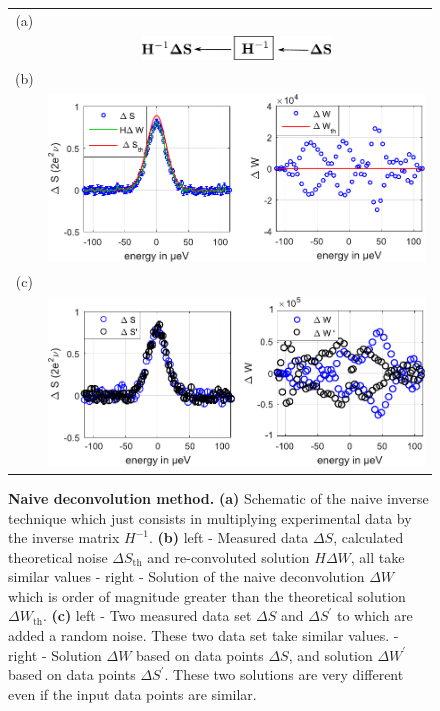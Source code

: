 \begin{figure}[hptb]
	\begin{center}
\begin{tabular}{c c}
	(a) &  \\ 
	
	& \includegraphics[width = 5cm]{./appA/naive_deconvolution} \\ 
	 
	(b) &  \\ 
	
	& \includegraphics[width = 10 cm]{./appA/Naive_method_results} \\
	(c) &  \\ 
	
	& \includegraphics[width = 10 cm]{./appA/Naive_method_results_bis} 
\end{tabular} 
\end{center}
\caption{\textbf{Naive deconvolution method.} \textbf{(a)} Schematic of the naive inverse technique which just consists in multiplying experimental data by the inverse matrix $H^{-1}$. \textbf{(b)} left - Measured data $\Delta S$, calculated theoretical noise $\Delta S_{\mathrm{th}}$ and re-convoluted solution $H\Delta W$, all take similar values - right - Solution of the naive deconvolution $\Delta W$ which is order of magnitude greater than the theoretical solution $\Delta W_{\mathrm{th}}$. \textbf{(c)} left - Two measured data set $\Delta S$ and $\Delta S^{\prime}$ to which are added a random noise. These two data set take similar values. - right - Solution $\Delta W$ based on data points $\Delta S$, and solution $\Delta W^{\prime}$ based on data points $\Delta S^{\prime}$. These two solutions are very different even if the input data points are similar.}
\label{fig: naive deconvolution}
\end{figure}


